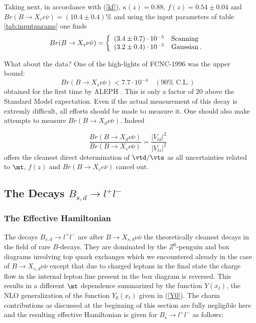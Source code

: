 Taking next, in accordance with (\ref{kf}), $\kappa(z)=0.88$,
$f(z)=0.54\pm 0.04$ and 
$Br(B\to X_ce\bar\nu)=(10.4\pm 0.4)\%$
and using the input parameters of table \ref{tab:inputparams}
one finds \cite{BJL96b}
\begin{equation}\label{klpnr3}
Br(B \to X_s \nu\bar\nu)=\left\{ \begin{array}{ll}
(3.4 \pm 0.7)\cdot 10^{-5} & {\rm Scanning} \\
(3.2 \pm 0.4) \cdot 10^{-5} & {\rm Gaussian}\,. \end{array} \right.
\end{equation}
 
What about the data? 
One of the high-lights of FCNC-1996 was the upper bound:
\begin{equation}\label{124}
Br(B\to X_s \nu\bar\nu) < 7.7\cdot 10^{-4} 
\quad
(90\%\,\,\mbox{C.L.})
\end{equation}
obtained for the first time by ALEPH \cite{Aleph96}.
This is only a factor of 20 above the Standard Model expectation.
Even if the actual measurement of this decay is extremly difficult,
all efforts should be made to measure it. One should also 
make attempts to measure $Br(B\to X_d \nu\bar\nu)$. Indeed 

\begin{equation}\label{bratio}
\frac{Br(B\to X_d\nu\bar\nu)}{Br(B\to X_s\nu\bar\nu)}=
\frac{|V_{td}|^2}{|V_{ts}|^2}
\end{equation} 
offers the
cleanest direct determination of $\vtd/\vts$ as all uncertainties related
to $\mt$, $f(z)$ and $Br(B\to X_ce\bar\nu)$ cancel out.
\subsection{The Decays $B_{s,d}\to l^+l^-$}
\subsubsection{The Effective Hamiltonian}
The decays $B_{s,d}\to l^+l^-$ are after $B\to X_{s,d}\nu\bar\nu$ 
the theoretically cleanest decays in the field of rare $B$-decays.
They are dominated by the $Z^0$-penguin and box diagrams
involving top quark exchanges which we encountered already
in the case of $B\to X_{s,d}\nu\bar\nu$   except that due to
charged leptons in the final state the charge flow in the
internal lepton line present in the box diagram is reversed.
This results in a different $\mt$ dependence summarized
by the function  $Y(x_t)$, the NLO generalization \cite{BB2}
of the function $Y_0(x_t)$ given in (\ref{Y0}).
The charm contributions as
discussed at the beginning of this section are fully negligible
here and the resulting effective Hamiltonian is given 
for $B_s\to l^+l^-$ as follows:

